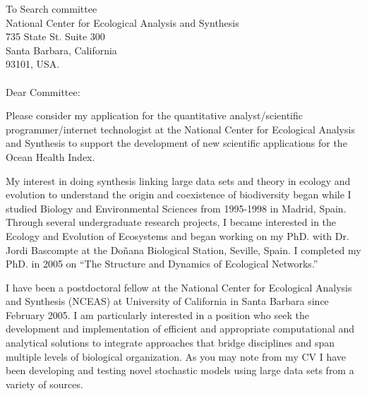 \documentclass[a4paper,11pt]{letter}
\begin{document}
\vspace{-6 in}

To Search committee\\
National Center for Ecological Analysis and Synthesis\\
735 State St. Suite 300\\
Santa Barbara, California\\
93101, USA.
\\
\\
Dear Committee:\\
\vspace{0.05 in}

Please consider my application for the quantitative analyst/scientific
programmer/internet technologist at the National Center for Ecological
Analysis and Synthesis to support the development of new scientific
applications for the Ocean Health Index.

My interest in doing synthesis linking large data sets and theory in
ecology and evolution to understand the origin and coexistence of
biodiversity began while I studied Biology and Environmental Sciences
from 1995-1998 in Madrid, Spain. Through several undergraduate
research projects, I became interested in the Ecology and Evolution of
Ecosystems and began working on my PhD. with Dr. Jordi Bascompte at
the Do\~nana Biological Station, Seville, Spain. I completed my
PhD. in 2005 on ``The Structure and Dynamics of Ecological Networks.''

I have been a postdoctoral fellow at the National Center for
Ecological Analysis and Synthesis (NCEAS) at University of California
in Santa Barbara since February 2005. I am particularly interested in
a position who seek the development and implementation of efficient
and appropriate computational and analytical solutions to integrate
approaches that bridge disciplines and span multiple levels of
biological organization. As you may note from my CV I have been
developing and testing novel stochastic models using large data sets
from a variety of sources.
\end{document}
